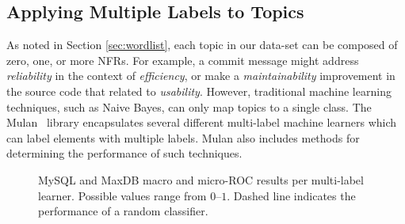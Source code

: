 \documentclass[smallextended]{svjour3}       %
\begin{document}

\subsection{Applying Multiple Labels to Topics}
\label{sec:multilabel}

As noted in Section \ref{sec:wordlist}, each topic in our data-set can be composed of zero, one, or more NFRs. 
For example, a commit message might address \textit{reliability} in the context of \textit{efficiency}, or make a \textit{maintainability} improvement
in the source code that related to \textit{usability}. 
However, traditional machine learning techniques, such as Naive Bayes, can only map topics to a single class. 
The Mulan~\cite{mulan} library encapsulates several different multi-label machine learners which can label elements with multiple labels.
Mulan also includes methods for determining the performance of such techniques.


\begin{figure}[t]
\centering
{}
\caption[]{MySQL and MaxDB macro and micro-ROC results per multi-label learner. Possible values range from $0$--$1$.  Dashed line indicates the performance of a random classifier.
}
\label{fig:mulan}
\end{figure}
\end{document}
